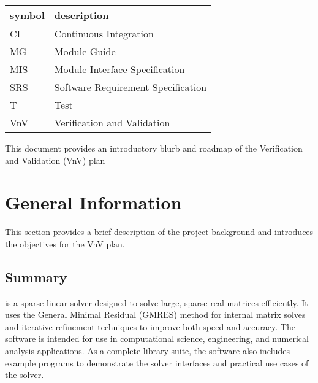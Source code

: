 \documentclass[12pt, titlepage]{article}
\begin{document}
\renewcommand{\arraystretch}{1.2}
\begin{tabular}{l l}
  \toprule
  \textbf{symbol} & \textbf{description}                     \\
  \midrule
  CI        & Continuous Integration             \\
  MG        & Module Guide                       \\
  MIS       & Module Interface Specification     \\
  SRS       & Software Requirement Specification \\
  T         & Test                               \\
  VnV       & Verification and Validation        \\
  \bottomrule
\end{tabular}



\newpage


This document provides an introductory blurb and roadmap of the Verification and
Validation (VnV) plan

\section{General Information}

This section provides a brief description of the project background and
introduces the objectives for the VnV plan.

\subsection{Summary}


\progname{} is a sparse linear solver designed to solve large, sparse real
matrices efficiently. It uses the General Minimal Residual (GMRES) method for
internal matrix solves and iterative refinement techniques to improve both speed
and accuracy. The software is intended for use in computational science,
engineering, and numerical analysis applications. As a complete library suite,
the software also includes example programs to demonstrate the solver interfaces
and practical use cases of the solver.
\end{document}

